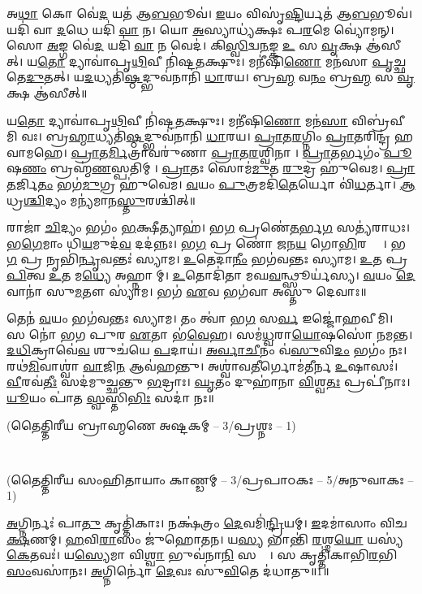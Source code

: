 𑌅\ul{𑌥𑌾} 𑌕𑍋 𑌵𑍇॑\ul{𑌦} 𑌯𑌤॑ 𑌆\ul{𑌬}𑌭𑍂𑌵॑।
\ul{𑌇}𑌯𑌂 𑌵𑌿𑌸𑍃॑\ul{𑌷𑍍𑌟𑌿}𑌰𑍍𑌯𑌤॑ 𑌆\ul{𑌬}𑌭𑍂𑌵॑।
𑌯𑌦𑌿॑ 𑌵𑌾 \ul{𑌦}𑌧𑍇 𑌯𑌦𑌿॑ \ul{𑌵𑌾} 𑌨।
𑌯𑍋 \ul{𑌅}𑌸𑍍𑌯𑌾𑌧𑍍𑌯॑𑌕𑍍𑌷𑌃 𑌪\ul{𑌰}𑌮𑍇 𑌵𑍍𑌯𑍋॑𑌮𑌨𑍍।
𑌸𑍋 \ul{𑌅}𑌙𑍍𑌗 𑌵𑍇॑\ul{𑌦} 𑌯𑌦𑌿॑ \ul{𑌵𑌾} 𑌨 𑌵𑍇𑌦॑।
𑌕𑌿\ul{𑌸𑍍𑌵𑌿}𑌦𑍍𑌵\ul{𑌨}𑌙𑍍𑌕 \ul{𑌉} 𑌸 \ul{𑌵𑍃}𑌕𑍍𑌷 𑌆॑𑌸𑍀𑌤𑍍।
𑌯\ul{𑌤𑍋} 𑌦𑍍𑌯𑌾𑌵𑌾॑𑌪𑍃\ul{𑌥𑌿}𑌵𑍀 𑌨𑌿॑𑌷𑍍𑌟\ul{𑌤}𑌕𑍍𑌷𑍁𑌃।
𑌮𑌨𑍀॑𑌷𑌿\ul{𑌣𑍋} 𑌮𑌨॑𑌸𑌾 \ul{𑌪𑍃}𑌚𑍍𑌛𑌤𑍇\ul{𑌦𑍁}𑌤𑌤𑍍।
𑌯\ul{𑌦}𑌧𑍍𑌯𑌤𑌿॑\ul{𑌷𑍍𑌠}𑌦𑍍𑌭𑍁𑌵॑𑌨𑌾𑌨𑌿 \ul{𑌧𑌾}𑌰𑌯\sn{}।
𑌬𑍍𑌰\ul{𑌹𑍍𑌮} 𑌵\ul{𑌨𑌂} 𑌬𑍍𑌰\ul{𑌹𑍍𑌮} 𑌸 \ul{𑌵𑍃}𑌕𑍍𑌷 𑌆॑𑌸𑍀𑌤𑍍॥


𑌯\ul{𑌤𑍋} 𑌦𑍍𑌯𑌾𑌵𑌾॑𑌪𑍃\ul{𑌥𑌿}𑌵𑍀 𑌨𑌿॑𑌷𑍍𑌟\ul{𑌤}𑌕𑍍𑌷𑍁𑌃।
𑌮𑌨𑍀॑𑌷𑌿\ul{𑌣𑍋} 𑌮𑌨॑\ul{𑌸𑌾} 𑌵𑌿𑌬𑍍𑌰॑𑌵𑍀𑌮𑌿 𑌵𑌃।
𑌬𑍍𑌰\ul{𑌹𑍍𑌮𑌾}𑌧𑍍𑌯𑌤𑌿॑\ul{𑌷𑍍𑌠}𑌦𑍍𑌭𑍁𑌵॑𑌨𑌾𑌨𑌿 \ul{𑌧𑌾}𑌰𑌯\sn{}।
\ul{𑌪𑍍𑌰𑌾}𑌤\ul{𑌰}𑌗𑍍𑌨𑌿𑌂 \ul{𑌪𑍍𑌰𑌾}𑌤𑌰𑌿𑌨𑍍𑌦𑍍𑌰॑ 𑌹𑌵𑌾𑌮𑌹𑍇।
\ul{𑌪𑍍𑌰𑌾}𑌤\ul{𑌰𑍍𑌮𑌿}𑌤𑍍𑌰𑌾𑌵𑌰𑍁॑𑌣𑌾 \ul{𑌪𑍍𑌰𑌾}𑌤\ul{𑌰}𑌶𑍍𑌵𑌿𑌨𑌾।
\ul{𑌪𑍍𑌰𑌾}𑌤𑌰𑍍𑌭𑌗𑌂॑ \ul{𑌪𑍂}𑌷\ul{𑌣𑌂} 𑌬𑍍𑌰𑌹𑍍𑌮॑\ul{𑌣}𑌸𑍍𑌪𑌤𑌿𑌮𑍍।
\ul{𑌪𑍍𑌰𑌾}𑌤𑌃 𑌸𑍋𑌮॑\ul{𑌮𑍁}𑌤 \ul{𑌰𑍁}𑌦𑍍𑌰 𑌹𑍁॑𑌵𑍇𑌮।
\ul{𑌪𑍍𑌰𑌾}\ul{𑌤}𑌰𑍍𑌜𑌿\ul{𑌤𑌂} 𑌭𑌗॑\ul{𑌮𑍁}𑌗𑍍𑌰 𑌹𑍁॑𑌵𑍇𑌮।
\ul{𑌵}𑌯𑌂 \ul{𑌪𑍁}𑌤𑍍𑌰𑌮𑌦𑌿॑\ul{𑌤𑍇}𑌰𑍍𑌯𑍋 𑌵𑌿॑\ul{𑌧}𑌰𑍍𑌤𑌾।
\ul{𑌆}𑌧𑍍𑌰\ul{𑌶𑍍𑌚𑌿}𑌦𑍍𑌯𑌂 𑌮𑌨𑍍𑌯॑𑌮𑌾𑌨\ul{𑌸𑍍𑌤𑍁}𑌰𑌶𑍍𑌚𑌿॑𑌤𑍍॥

𑌰𑌾𑌜𑌾॑ \ul{𑌚𑌿}𑌦𑍍𑌯𑌂 𑌭𑌗𑌂॑ \ul{𑌭}𑌕𑍍𑌷𑍀𑌤𑍍𑌯𑌾𑌹॑।
𑌭\ul{𑌗} 𑌪𑍍𑌰𑌣𑍇॑\ul{𑌤}𑌰𑍍𑌭\ul{𑌗} 𑌸𑌤𑍍𑌯॑𑌰𑌾𑌧𑌃।
𑌭\ul{𑌗𑍇}𑌮𑌾𑌂 𑌧𑌿\ul{𑌯}𑌮𑍁𑌦॑\ul{𑌵} 𑌦𑌦॑𑌨𑍍𑌨𑌃।
𑌭\ul{𑌗} 𑌪𑍍𑌰 𑌣𑍋॑ 𑌜𑌨\ul{𑌯} 𑌗𑍋\ul{𑌭𑌿}𑌰𑌶𑍍𑌵𑍈𑌃᳚।
𑌭\ul{𑌗} 𑌪𑍍𑌰 𑌨𑍃𑌭𑌿॑\ul{𑌰𑍍𑌨𑍃}𑌵𑌨𑍍𑌤𑌃॑ 𑌸𑍍𑌯𑌾𑌮।
\ul{𑌉}𑌤𑍇𑌦𑌾\ul{𑌨𑍀𑌂} 𑌭𑌗॑𑌵𑌨𑍍𑌤𑌃 𑌸𑍍𑌯𑌾𑌮।
\ul{𑌉}𑌤 𑌪𑍍𑌰\ul{𑌪𑌿}𑌤𑍍𑌵 \ul{𑌉}𑌤 𑌮\ul{𑌧𑍍𑌯𑍇} 𑌅𑌹𑍍𑌨𑌾𑌮𑍍।
\ul{𑌉}𑌤𑍋𑌦𑌿॑𑌤𑌾 𑌮𑌘\ul{𑌵}𑌨𑍍𑌥𑍍𑌸𑍂𑌰𑍍𑌯॑𑌸𑍍𑌯।
\ul{𑌵}𑌯𑌂 \ul{𑌦𑍇}𑌵𑌾𑌨𑌾॑ 𑌸𑍁\ul{𑌮}𑌤𑍗 𑌸𑍍𑌯𑌾॑𑌮।
𑌭𑌗॑ \ul{𑌏}𑌵 𑌭𑌗॑𑌵𑌾 𑌅𑌸𑍍𑌤𑍁 𑌦𑍇𑌵𑌾𑌃॥

𑌤𑍇𑌨॑ \ul{𑌵}𑌯𑌂 𑌭𑌗॑𑌵𑌨𑍍𑌤𑌃 𑌸𑍍𑌯𑌾𑌮।
𑌤𑌂 𑌤𑍍𑌵𑌾॑ 𑌭\ul{𑌗} 𑌸\ul{𑌰𑍍𑌵} 𑌇𑌜𑍍𑌜𑍋॑𑌹𑌵𑍀𑌮𑌿।
𑌸 𑌨𑍋॑ 𑌭𑌗 𑌪𑍁𑌰 \ul{𑌏}𑌤𑌾 𑌭॑\ul{𑌵𑍇}𑌹।
𑌸𑌮॑\ul{𑌧𑍍𑌵}𑌰𑌾\ul{𑌯𑍋}𑌷𑌸𑍋॑ 𑌨𑌮𑌨𑍍𑌤।
\ul{𑌦}\ul{𑌧𑌿}𑌕𑍍𑌰𑌾𑌵𑍇॑\ul{𑌵} 𑌶𑍁𑌚॑𑌯𑍇 \ul{𑌪}𑌦𑌾𑌯॑।
\ul{𑌅}\ul{𑌰𑍍𑌵𑌾}\ul{𑌚𑍀}𑌨𑌂 𑌵॑\ul{𑌸𑍁}𑌵𑌿\ul{𑌦𑌂} 𑌭𑌗𑌂॑ 𑌨𑌃।
𑌰𑌥॑\ul{𑌮𑌿}𑌵𑌾𑌶𑍍𑌵𑌾॑ \ul{𑌵𑌾}𑌜𑌿\ul{𑌨} 𑌆𑌵॑𑌹𑌨𑍍𑌤𑍁।
𑌅𑌶𑍍𑌵𑌾॑𑌵\ul{𑌤𑍀}𑌰𑍍𑌗𑍋𑌮॑𑌤𑍀𑌰𑍍𑌨 \ul{𑌉}𑌷𑌾𑌸𑌃॑।
\ul{𑌵𑍀}𑌰𑌵॑\ul{𑌤𑍀𑌃} 𑌸𑌦॑𑌮𑍁𑌚𑍍𑌛𑌨𑍍𑌤𑍁 \ul{𑌭}𑌦𑍍𑌰𑌾𑌃।
\ul{𑌘𑍃}𑌤𑌂 𑌦𑍁𑌹𑌾॑𑌨𑌾 \ul{𑌵𑌿}𑌶𑍍𑌵\ul{𑌤𑌃} 𑌪𑍍𑌰𑌪𑍀॑𑌨𑌾𑌃।
\ul{𑌯𑍂}𑌯𑌂 𑌪𑌾॑𑌤 \ul{𑌸𑍍𑌵}𑌸𑍍𑌤𑌿\ul{𑌭𑌿𑌃} 𑌸𑌦𑌾॑ 𑌨𑌃॥

\centerline{\normalsize(𑌤𑍈𑌤𑍍𑌤𑌿𑌰𑍀𑌯 𑌬𑍍𑌰𑌾𑌹𑍍𑌮𑌣𑍇 𑌅𑌷𑍍𑌟𑌕𑌮𑍍 -- 3/𑌪𑍍𑌰𑌶𑍍𑌨𑌃 -- 1)}\mbox{}\\[-2em]
\centerline{\normalsize(𑌤𑍈𑌤𑍍𑌤𑌿𑌰𑍀𑌯 𑌸𑌂𑌹𑌿𑌤𑌾𑌯𑌾𑌂 𑌕𑌾𑌣𑍍𑌡𑌮𑍍 -- 3/𑌪𑍍𑌰𑌪𑌾𑌠𑌕𑌃 -- 5/𑌅𑌨𑍁𑌵𑌾𑌕𑌃 --1)}

\ul{𑌅}𑌗𑍍𑌨𑌿𑌰𑍍𑌨𑌃॑ 𑌪𑌾\ul{𑌤𑍁} 𑌕𑍃𑌤𑍍𑌤𑌿॑𑌕𑌾𑌃। 
𑌨𑌕𑍍𑌷॑𑌤𑍍𑌰𑌂 \ul{𑌦𑍇}𑌵𑌮𑌿॑\ul{𑌨𑍍𑌦𑍍𑌰𑌿}𑌯𑌮𑍍। 
\ul{𑌇}𑌦𑌮𑌾॑𑌸𑌾𑌂 𑌵𑌿𑌚\ul{𑌕𑍍𑌷}𑌣𑌮𑍍। 
\ul{𑌹}𑌵𑌿\ul{𑌰𑌾}𑌸𑌂 𑌜𑍁॑𑌹𑍋𑌤𑌨। 
𑌯\ul{𑌸𑍍𑌯} 𑌭𑌾𑌨𑍍𑌤𑌿॑ \ul{𑌰}𑌶𑍍𑌮\ul{𑌯𑍋} 𑌯𑌸𑍍𑌯॑ \ul{𑌕𑍇}𑌤𑌵𑌃॑। 
𑌯\ul{𑌸𑍍𑌯𑍇}𑌮𑌾 𑌵𑌿\ul{𑌶𑍍𑌵𑌾} 𑌭𑍁𑌵॑𑌨𑌾\ul{𑌨𑌿} 𑌸𑌰𑍍𑌵𑌾᳚। 
𑌸 𑌕𑍃𑌤𑍍𑌤𑌿॑𑌕𑌾𑌭𑌿\-\ul{𑌰}𑌭𑌿\ul{𑌸𑌂}𑌵𑌸𑌾॑𑌨𑌃। 
\ul{𑌅}𑌗𑍍𑌨𑌿𑌰𑍍𑌨𑍋॑ \ul{𑌦𑍇}𑌵𑌃 𑌸𑍁॑\ul{𑌵𑌿}𑌤𑍇 𑌦॑𑌧𑌾𑌤𑍁॥1॥ 

